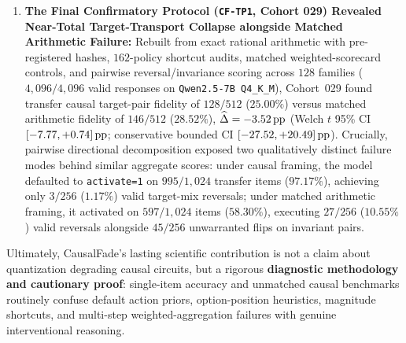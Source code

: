 \begin{enumerate}
  \item \textbf{The Final Confirmatory Protocol (\texttt{CF-TP1}, Cohort 029) Revealed Near-Total Target-Transport Collapse alongside Matched Arithmetic Failure:} Rebuilt from exact rational arithmetic with pre-registered hashes, $162$-policy shortcut audits, matched weighted-scorecard controls, and pairwise reversal/invariance scoring across $128$ families ($4{,}096/4{,}096$ valid responses on \texttt{Qwen2.5-7B Q4\_K\_M}), Cohort~029 found transfer causal target-pair fidelity of $128/512$ ($25.00\%$) versus matched arithmetic fidelity of $146/512$ ($28.52\%$), $\widehat{\Delta} = -3.52\,\mathrm{pp}$ (Welch $t$ 95\% CI $[-7.77, +0.74]\,\mathrm{pp}$; conservative bounded CI $[-27.52, +20.49]\,\mathrm{pp}$). Crucially, pairwise directional decomposition exposed two qualitatively distinct failure modes behind similar aggregate scores: under causal framing, the model defaulted to \texttt{activate=1} on $995/1{,}024$ transfer items ($97.17\%$), achieving only $3/256$ ($1.17\%$) valid target-mix reversals; under matched arithmetic framing, it activated on $597/1{,}024$ items ($58.30\%$), executing $27/256$ ($10.55\%$) valid reversals alongside $45/256$ unwarranted flips on invariant pairs.
\end{enumerate}

Ultimately, CausalFade's lasting scientific contribution is not a claim about quantization degrading causal circuits, but a rigorous \textbf{diagnostic methodology and cautionary proof}: single-item accuracy and unmatched causal benchmarks routinely confuse default action priors, option-position heuristics, magnitude shortcuts, and multi-step weighted-aggregation failures with genuine interventional reasoning.
